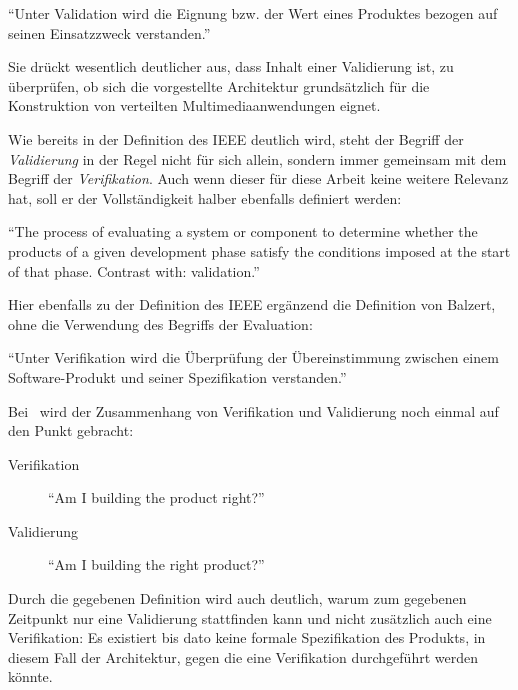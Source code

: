   \begin{definition}\label{def:validierung_balzert}
    "`Unter Validation wird die Eignung bzw. der Wert eines Produktes bezogen auf seinen Einsatzzweck verstanden."'~\emph{\citep[S. 101]{balzert1998lst}}
  \end{definition}
  
  Sie drückt wesentlich deutlicher aus, dass Inhalt einer Validierung ist, zu überprüfen, ob sich die vorgestellte Architektur grundsätzlich für die Konstruktion von verteilten Multimediaanwendungen eignet.
  
  Wie bereits in der Definition des IEEE deutlich wird, steht der Begriff der \emph{Validierung} in der Regel nicht für sich allein, sondern immer gemeinsam mit dem Begriff der \emph{Verifikation}. Auch wenn dieser für diese Arbeit keine weitere Relevanz hat, soll er der Vollständigkeit halber ebenfalls definiert werden:
  
  \begin{definition}\label{def:verifikation_ieee}
    "`The process of evaluating a system or component to determine whether the products of a given development phase satisfy the conditions imposed at the start of that phase. Contrast with: validation."'~\emph{\citep{ieee90sg}}
  \end{definition}
  
  Hier ebenfalls zu der Definition des IEEE ergänzend die Definition von Balzert, ohne die Verwendung des Begriffs der Evaluation:
  
  \begin{definition}\label{def:verifikation_balzert}
    "`Unter Verifikation wird die Überprüfung der Übereinstimmung zwischen einem Software-Produkt und seiner Spezifikation verstanden."'~\emph{\citep[S. 101]{balzert1998lst}}
  \end{definition}
  
  Bei~\citep{boehm1984vv} wird der Zusammenhang von Verifikation und Validierung noch einmal auf den Punkt gebracht:
  
  \begin{description}
    \item[Verifikation] "`Am I building the product right?"'~\citep[S. 75]{boehm1984vv}
    \item[Validierung] "`Am I building the right product?"'~\citep[S. 75]{boehm1984vv}
  \end{description}
  
  Durch die gegebenen Definition wird auch deutlich, warum zum gegebenen Zeitpunkt nur eine Validierung stattfinden kann und nicht zusätzlich auch eine Verifikation: Es existiert bis dato keine formale Spezifikation des Produkts, in diesem Fall der Architektur, gegen die eine Verifikation durchgeführt werden könnte.
  
